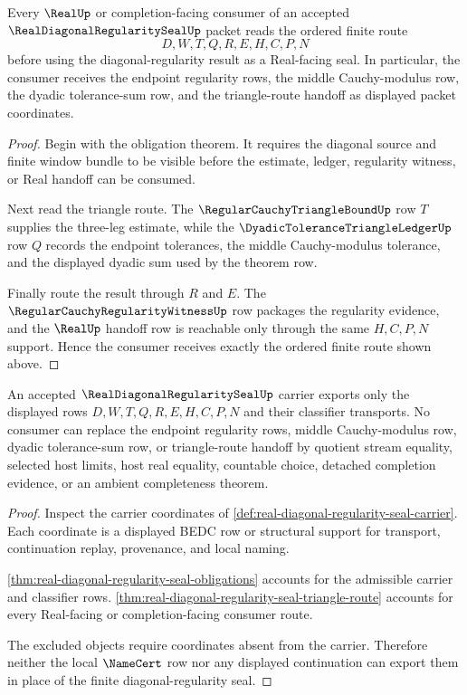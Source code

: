 \begin{theorem}
\label{thm:real-diagonal-regularity-seal-triangle-route}
Every $\RealUp$ or completion-facing consumer of an accepted $\RealDiagonalRegularitySealUp$ packet reads the ordered finite route
$$
D,W,T,Q,R,E,H,C,P,N
$$
before using the diagonal-regularity result as a Real-facing seal. In particular, the consumer receives the endpoint regularity rows, the middle Cauchy-modulus row, the dyadic tolerance-sum row, and the triangle-route handoff as displayed packet coordinates.
\end{theorem}
\begin{proof}
Begin with the obligation theorem. It requires the diagonal source and finite window bundle to be visible before the estimate, ledger, regularity witness, or Real handoff can be consumed.

Next read the triangle route. The $\RegularCauchyTriangleBoundUp$ row $T$ supplies the three-leg estimate, while the $\DyadicToleranceTriangleLedgerUp$ row $Q$ records the endpoint tolerances, the middle Cauchy-modulus tolerance, and the displayed dyadic sum used by the theorem row.

Finally route the result through $R$ and $E$. The $\RegularCauchyRegularityWitnessUp$ row packages the regularity evidence, and the $\RealUp$ handoff row is reachable only through the same $H,C,P,N$ support. Hence the consumer receives exactly the ordered finite route shown above.
\end{proof}

\begin{theorem}
\label{thm:real-diagonal-regularity-seal-nonescape}
An accepted $\RealDiagonalRegularitySealUp$ carrier exports only the displayed rows $D,W,T,Q,R,E,H,C,P,N$ and their classifier transports. No consumer can replace the endpoint regularity rows, middle Cauchy-modulus row, dyadic tolerance-sum row, or triangle-route handoff by quotient stream equality, selected host limits, host real equality, countable choice, detached completion evidence, or an ambient completeness theorem.
\end{theorem}
\begin{proof}
Inspect the carrier coordinates of \autoref{def:real-diagonal-regularity-seal-carrier}. Each coordinate is a displayed BEDC row or structural support for transport, continuation replay, provenance, and local naming.

\autoref{thm:real-diagonal-regularity-seal-obligations} accounts for the admissible carrier and classifier rows. \autoref{thm:real-diagonal-regularity-seal-triangle-route} accounts for every Real-facing or completion-facing consumer route.

The excluded objects require coordinates absent from the carrier. Therefore neither the local $\NameCert$ row nor any displayed continuation can export them in place of the finite diagonal-regularity seal.
\end{proof}

